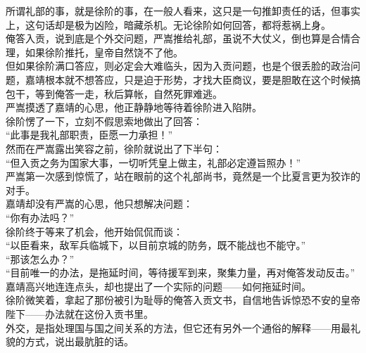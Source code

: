 \begin{multicols}{\theparacolNo}
所谓礼部的事，就是徐阶的事，在一般人看来，这只是一句推卸责任的话，但事实上，这句话却是极为凶险，暗藏杀机。无论徐阶如何回答，都将惹祸上身。\\

俺答入贡，说到底是个外交问题，严嵩推给礼部，虽说不大仗义，倒也算是合情合理，如果徐阶推托，皇帝自然饶不了他。\\

但如果徐阶满口答应，则必定会大难临头，因为入贡问题，也是个很丢脸的政治问题，嘉靖根本就不想答应，只是迫于形势，才找大臣商议，要是胆敢在这个时候搞包干，等到俺答一走，秋后算帐，自然死罪难逃。\\

严嵩摸透了嘉靖的心思，他正静静地等待着徐阶进入陷阱。\\

徐阶愣了一下，立刻不假思索地做出了回答：\\

“此事是我礼部职责，臣愿一力承担！”\\

然而在严嵩露出笑容之前，徐阶就说出了下半句：\\

“但入贡之务为国家大事，一切听凭皇上做主，礼部必定遵旨照办！”\\

严嵩第一次感到惊慌了，站在眼前的这个礼部尚书，竟然是一个比夏言更为狡诈的对手。\\

嘉靖却没有严嵩的心思，他只想解决问题：\\

“你有办法吗？”\\

徐阶终于等来了机会，他开始侃侃而谈：\\

“以臣看来，敌军兵临城下，以目前京城的防务，既不能战也不能守。”\\

“那该怎么办？”\\

“目前唯一的办法，是拖延时间，等待援军到来，聚集力量，再对俺答发动反击。”\\

嘉靖高兴地连连点头，却也提出了一个实际的问题——如何拖延时间。\\

徐阶微笑着，拿起了那份被引为耻辱的俺答入贡文书，自信地告诉惊恐不安的皇帝陛下——办法就在这份入贡书里。\\

外交，是指处理国与国之间关系的方法，但它还有另外一个通俗的解释——用最礼貌的方式，说出最肮脏的话。\\


\end{multicols}
